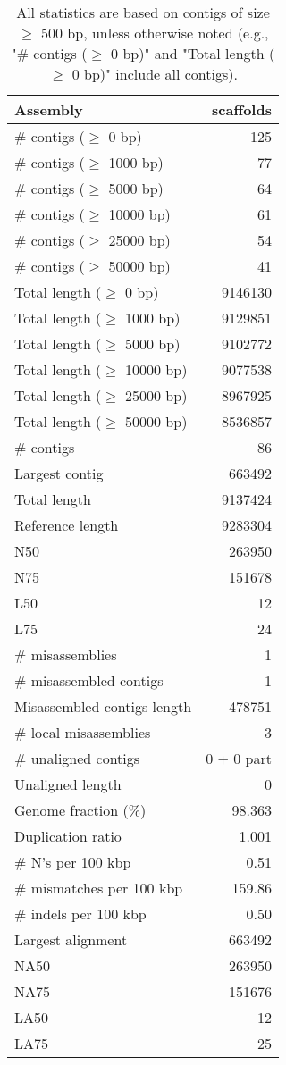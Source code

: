 \documentclass[12pt,a4paper]{article}
\begin{document}
\begin{table}[ht]
\begin{center}
\caption{All statistics are based on contigs of size $\geq$ 500 bp, unless otherwise noted (e.g., "\# contigs ($\geq$ 0 bp)" and "Total length ($\geq$ 0 bp)" include all contigs).}
\begin{tabular}{|l*{1}{|r}|}
\hline
Assembly & scaffolds \\ \hline
\# contigs ($\geq$ 0 bp) & 125 \\ \hline
\# contigs ($\geq$ 1000 bp) & 77 \\ \hline
\# contigs ($\geq$ 5000 bp) & 64 \\ \hline
\# contigs ($\geq$ 10000 bp) & 61 \\ \hline
\# contigs ($\geq$ 25000 bp) & 54 \\ \hline
\# contigs ($\geq$ 50000 bp) & 41 \\ \hline
Total length ($\geq$ 0 bp) & 9146130 \\ \hline
Total length ($\geq$ 1000 bp) & 9129851 \\ \hline
Total length ($\geq$ 5000 bp) & 9102772 \\ \hline
Total length ($\geq$ 10000 bp) & 9077538 \\ \hline
Total length ($\geq$ 25000 bp) & 8967925 \\ \hline
Total length ($\geq$ 50000 bp) & 8536857 \\ \hline
\# contigs & 86 \\ \hline
Largest contig & 663492 \\ \hline
Total length & 9137424 \\ \hline
Reference length & 9283304 \\ \hline
N50 & 263950 \\ \hline
N75 & 151678 \\ \hline
L50 & 12 \\ \hline
L75 & 24 \\ \hline
\# misassemblies & 1 \\ \hline
\# misassembled contigs & 1 \\ \hline
Misassembled contigs length & 478751 \\ \hline
\# local misassemblies & 3 \\ \hline
\# unaligned contigs & 0 + 0 part \\ \hline
Unaligned length & 0 \\ \hline
Genome fraction (\%) & 98.363 \\ \hline
Duplication ratio & 1.001 \\ \hline
\# N's per 100 kbp & 0.51 \\ \hline
\# mismatches per 100 kbp & 159.86 \\ \hline
\# indels per 100 kbp & 0.50 \\ \hline
Largest alignment & 663492 \\ \hline
NA50 & 263950 \\ \hline
NA75 & 151676 \\ \hline
LA50 & 12 \\ \hline
LA75 & 25 \\ \hline
\end{tabular}
\end{center}
\end{table}
\end{document}
